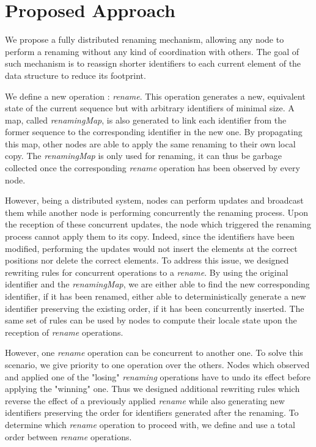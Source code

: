 \documentclass[sigplan]{acmart}
\begin{document}
\section{Proposed Approach}

We propose a fully distributed renaming mechanism, allowing any node to perform a renaming without any kind of coordination with others.
The goal of such mechanism is to reassign shorter identifiers to each current element of the data structure to reduce its footprint.

We define a new operation : \emph{rename}.
This operation generates a new, equivalent state of the current sequence but with arbitrary identifiers of minimal size.
A map, called \emph{renamingMap}, is also generated to link each identifier from the former sequence to the corresponding identifier in the new one.
By propagating this map, other nodes are able to apply the same renaming to their own local copy.
The \emph{renamingMap} is only used for renaming, it can thus be garbage collected once the corresponding \emph{rename} operation has been observed by every node.

However, being a distributed system, nodes can perform updates and broadcast them while another node is performing concurrently the renaming process.
Upon the reception of these concurrent updates, the node which triggered the renaming process cannot apply them to its copy.
Indeed, since the identifiers have been modified, performing the updates would not insert the elements at the correct positions nor delete the correct elements.
To address this issue, we designed rewriting rules for concurrent operations to a \emph{rename}.
By using the original identifier and the \emph{renamingMap}, we are either able to find the new corresponding identifier, if it has been renamed, either able to deterministically generate a new identifier preserving the existing order, if it has been concurrently inserted.
The same set of rules can be used by nodes to compute their locale state upon the reception of \emph{rename} operations.

However, one \emph{rename} operation can be concurrent to another one.
To solve this scenario, we give priority to one operation over the others.
Nodes which observed and applied one of the "losing" \emph{renaming} operations have to undo its effect before applying the "winning" one.
Thus we designed additional rewriting rules which reverse the effect of a previously applied \emph{rename} while also generating new identifiers preserving the order for identifiers generated after the renaming.
To determine which \emph{rename} operation to proceed with, we define and use a total order between \emph{rename} operations.
\end{document}
